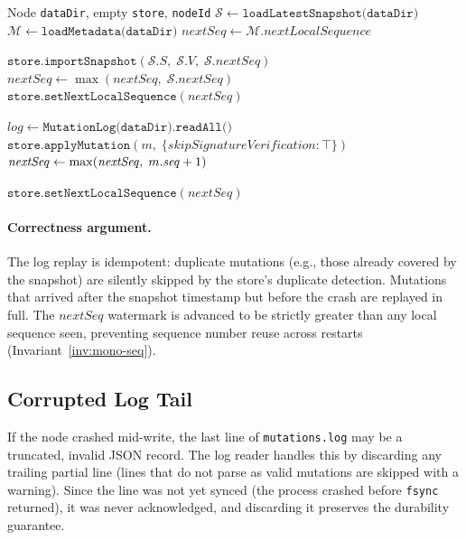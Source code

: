 \begin{algorithm}[H]
\caption{Node crash recovery (\texttt{recover})}
\label{alg:recovery}
\begin{algorithmic}[1]
\Require Node \texttt{dataDir}, empty \texttt{store}, \texttt{nodeId}
\State $\mathcal{S} \leftarrow \texttt{loadLatestSnapshot(dataDir)}$
\State $\mathcal{M} \leftarrow \texttt{loadMetadata(dataDir)}$
\State $\mathit{nextSeq} \leftarrow \mathcal{M}.\mathit{nextLocalSequence}$

  \State $\texttt{store.importSnapshot}(\mathcal{S}.S,\; \mathcal{S}.V,\; \mathcal{S}.\mathit{nextSeq})$
  \State $\mathit{nextSeq} \leftarrow \max(\mathit{nextSeq},\; \mathcal{S}.\mathit{nextSeq})$
\Else
  \State $\texttt{store.setNextLocalSequence}(\mathit{nextSeq})$
\EndIf

\State $\mathit{log} \leftarrow \texttt{MutationLog(dataDir).readAll()}$
  \State $\texttt{store.applyMutation}(m,\; \{\mathit{skipSignatureVerification}: \top\})$
    \State $\mathit{nextSeq} \leftarrow \max(\mathit{nextSeq},\; m.\mathit{seq} + 1)$
  \EndIf
\EndFor

\State $\texttt{store.setNextLocalSequence}(\mathit{nextSeq})$
\end{algorithmic}
\end{algorithm}

\paragraph{Correctness argument.}
The log replay is idempotent: duplicate mutations (e.g., those already covered
by the snapshot) are silently skipped by the store's duplicate detection.
Mutations that arrived after the snapshot timestamp but before the crash are
replayed in full. The $\mathit{nextSeq}$ watermark is advanced to be strictly
greater than any local sequence seen, preventing sequence number reuse across
restarts (Invariant~\ref{inv:mono-seq}).

\subsection{Corrupted Log Tail}

If the node crashed mid-write, the last line of \texttt{mutations.log} may be
a truncated, invalid JSON record. The log reader handles this by discarding any
trailing partial line (lines that do not parse as valid mutations are skipped
with a warning). Since the line was not yet synced (the process crashed before
\texttt{fsync} returned), it was never acknowledged, and discarding it
preserves the durability guarantee.

